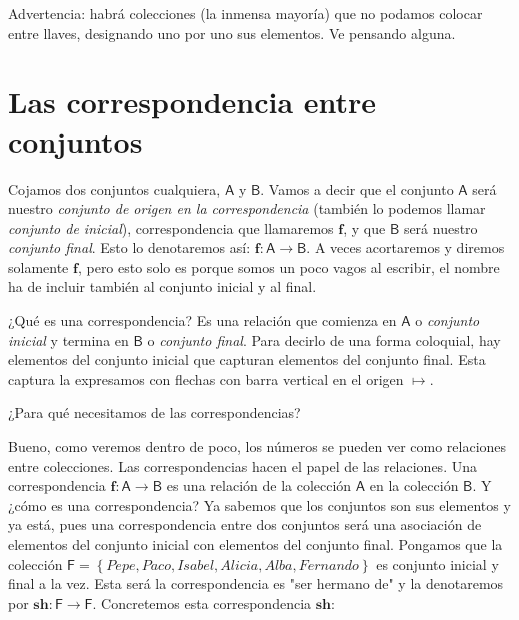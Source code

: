 \documentclass{amsart}
\theoremstyle{definition}
\theoremstyle{remark}
\numberwithin{equation}{section}
\newcommand{\set}[1]{\left\lbrace{#1}\right\rbrace}
\newcommand{\fromto}{\longrightarrow}
\newcommand{\setsymbol}[1]{\textsf{#1}}
\newcommand{\sA}{\setsymbol{A}}
\newcommand{\sB}{\setsymbol{B}}
\newcommand{\sF}{\setsymbol{F}}
\newcommand{\monrel}[1]{\mathbf{#1}}
\begin{document}
	
	
	Advertencia: habrá colecciones (la inmensa mayoría) que no podamos
colocar entre llaves, designando uno por uno sus elementos. Ve pensando
alguna.
	
	
	\section{Las correspondencia entre conjuntos}
	
	
	Cojamos dos conjuntos cualquiera, $\sA$ y $\sB$. Vamos a decir que el
conjunto $\sA$ será nuestro \emph{conjunto de origen en la correspondencia}
(también lo podemos llamar \emph{conjunto de inicial}), correspondencia que
llamaremos $\monrel{f}$, y que $\sB$ será nuestro \emph{conjunto final}. Esto
lo denotaremos así: $\monrel{f} : \sA \fromto \sB$. A veces acortaremos y
diremos solamente $\monrel{f}$, pero esto solo es porque somos un poco vagos
al escribir, el nombre ha de incluir también al conjunto inicial y al final.
	
	
	¿Qué es una correspondencia? Es una relación que comienza en $\sA$ o
\emph{conjunto inicial} y termina en $\sB$ o \emph{conjunto final}. Para
decirlo de una forma coloquial, hay elementos del conjunto inicial que
capturan elementos del conjunto final. Esta captura la expresamos con flechas
con barra vertical en el origen $\mapsto$.
	
	
	
	¿Para qué necesitamos de las correspondencias?
	
	
	Bueno, como veremos dentro de poco, los números se pueden ver como 
relaciones entre colecciones. Las correspondencias hacen el papel de las 
relaciones. Una correspondencia $\monrel{f}:\sA\fromto\sB$ es una relación de 
la colección $\sA$ en la colección $\sB$.  Y ¿cómo es una correspondencia? Ya 
sabemos que los conjuntos son sus elementos y ya está, pues una 
correspondencia entre dos conjuntos será una asociación de elementos del 
conjunto inicial con elementos del conjunto final. Pongamos que la colección 
$\sF=\set{Pepe,Paco,Isabel,Alicia,Alba,Fernando}$ es conjunto inicial y final 
a la vez. Esta será la correspondencia es "ser hermano de" y la denotaremos 
por $\monrel{sh}: \sF\fromto\sF$.
	Concretemos esta correspondencia $\monrel{sh}$:
	
\end{document}
